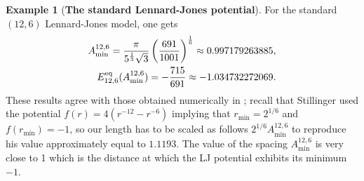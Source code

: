 \documentclass[12pt]{iopart}
\theoremstyle{definition}
\newtheorem{example}[thm]{Example}
\begin{document}
\begin{example}[\textbf{The standard Lennard-Jones potential}]
For the standard $(12,6)$ Lennard-Jones model, one gets
\begin{eqnarray} 
A^{12,6}_{\min} = \frac{\pi}{5^{\frac{1}{3}}\sqrt{3} } \left( \frac{691}{1001} \right)^{\frac{1}{6}}
\approx 0.997179263885 , \nonumber \\
E_{12,6}^{\rm eq}(A^{12,6}_{\min}) = - \frac{715}{691} \approx - 1.034732272069 . 
\end{eqnarray}
These results agree with those obtained numerically
 in \cite{Stillinger95}; recall that Stillinger used the potential
$f(r)=4(r^{-12}-r^{-6})$ implying that $r_{\min}=2^{1/6}$ and $f(r_{\min})=-1$,
so our length has to be scaled as follows $2^{1/6}A^{12,6}_{\min}$
to reproduce his value approximately equal to $1.1193$.
The value of the spacing $A^{12,6}_{\min}$ is very close to 1
which is the distance at which the LJ potential exhibits its minimum $-1$.
\end{example}
\end{document}
